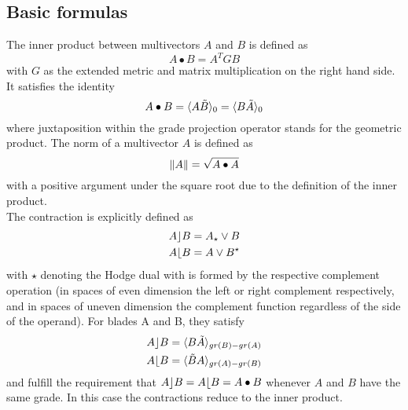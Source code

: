 \subsection{Basic formulas}
\label{basic_formulas}

The inner product between multivectors $A$ and $B$ is defined as
\begin{equation}
    A \bullet B = A^{T} G B
    \label{eg:inner_product_metric}
\end{equation}
with $G$ as the extended metric and matrix multiplication on the right hand side. It
satisfies the identity
\begin{equation}
    A \bullet B  = \langle {A \tilde{B}} \rangle_{0} = \langle { B \tilde{A} } \rangle_{0}
    \label{eq:inner_product_link_to_gpr}
\end{equation}
where juxtaposition within the grade projection operator stands for the geometric product.
The norm of a multivector $A$ is defined as
\begin{equation}
    \left \lVert {A} \right \rVert = \sqrt{A \bullet A}
    \label{eq:norm_mv}
\end{equation}
with a positive argument under the square root due to the definition of the inner product.
\\

The contraction is explicitly defined as
\begin{subequations}
    \begin{align}
    A \rfloor B & = A_{\star} \vee B
    \label{eq:lcontr} \\
    A \lfloor B & = A \vee B^{\star}
    \label{eq:rcontr}
    \end{align}
\end{subequations}
with $\star$ denoting the Hodge dual with is formed by the respective complement operation
(in spaces of even dimension the left or right complement respectively, and in spaces of
uneven dimension the complement function regardless of the side of the operand). For
blades A and B, they satisfy
\begin{subequations}
    \begin{align}
    A \rfloor B & = \langle {B \tilde{A}} \rangle_{gr(B)-gr(A)}
    \label{eq:lcontr_gpr} \\
    A \lfloor B & = \langle {\tilde{B} A} \rangle_{gr(A)-gr(B)}
    \label{eq:rcontr_gpr}
    \end{align}
\end{subequations}
and fulfill the requirement that $A \rfloor B = A \lfloor B = A \bullet B$ whenever $A$
and $B$ have the same grade. In this case the contractions reduce to the inner product. \\


